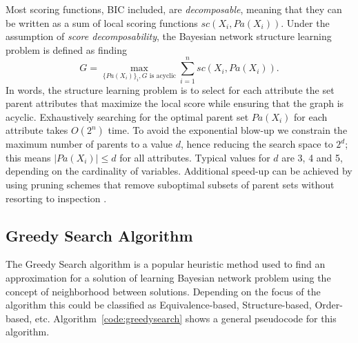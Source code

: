         Most scoring functions, BIC included, are \emph{decomposable}, meaning that they can be written as a sum of local scoring functions $sc(X_i, {Pa}(X_i))$. Under the assumption of \emph{score decomposability}, the Bayesian network structure learning problem is defined as finding
        \begin{equation}
        		\label{eq:decomposability}
		G = \max_{\{ {Pa}(X_i)\}_i, G \text{ is acyclic}} \sum_{i=1}^n {sc}( X_i , {Pa}( X_i ) ) .
	\end{equation}
In words, the structure learning problem is to select for each attribute the set parent attributes that maximize the local score while ensuring that the graph is acyclic. Exhaustively searching for the optimal parent set ${Pa}( X_i)$ for each attribute takes $O(2^n)$ time. To avoid the exponential blow-up we constrain the maximum number of parents to a value $d$, hence reducing the search space to $2^d$; this means $|{Pa}( X_i )| \leq d$ for all attributes. Typical values for $d$ are 3, 4 and 5, depending on the cardinality of variables. Additional speed-up can be achieved by using pruning schemes that remove suboptimal subsets of parent sets without resorting to inspection \cite{Cassio11}.

\subsection{Greedy Search Algorithm}
\label{subsec:greedysearch}

The Greedy Search algorithm is a popular heuristic method used to find an approximation for a solution of  learning Bayesian network problem using the concept of neighborhood between solutions. Depending on the focus of the algorithm this could be classified as Equivalence-based, Structure-based, Order-based, etc. Algorithm~\ref{code:greedysearch} shows a general pseudocode for this algorithm.

